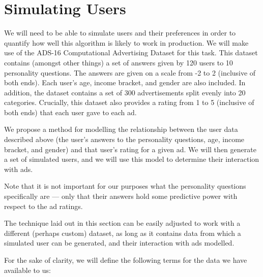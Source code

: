 \section{Simulating Users}

We will need to be able to simulate users and their preferences in order to quantify how well this algorithm is likely to work in production. We will make use of the ADS-16 Computational Advertising Dataset\cite{ads16} for this task. This dataset contains (amongst other things) a set of answers given by 120 users to 10 personality questions. The answers are given on a scale from -2 to 2 (inclusive of both ends). Each user's age, income bracket, and gender are also included. In addition, the dataset contains a set of 300 advertisements split evenly into 20 categories. Crucially, this dataset also provides a rating from 1 to 5 (inclusive of both ends) that each user gave to each ad.

We propose a method for modelling the relationship between the user data described above (the user's answers to the personality questions, age, income bracket, and gender) and that user's rating for a given ad. We will then generate a set of simulated users, and we will use this model to determine their interaction with ads.

Note that it is not important for our purposes what the personality questions specifically are --- only that their answers hold some predictive power with respect to the ad ratings.

The technique laid out in this section can be easily adjusted to work with a different (perhaps custom) dataset, as long as it contains data from which a simulated user can be generated, and their interaction with ads modelled.

For the sake of clarity, we will define the following terms for the data we have available to us:

